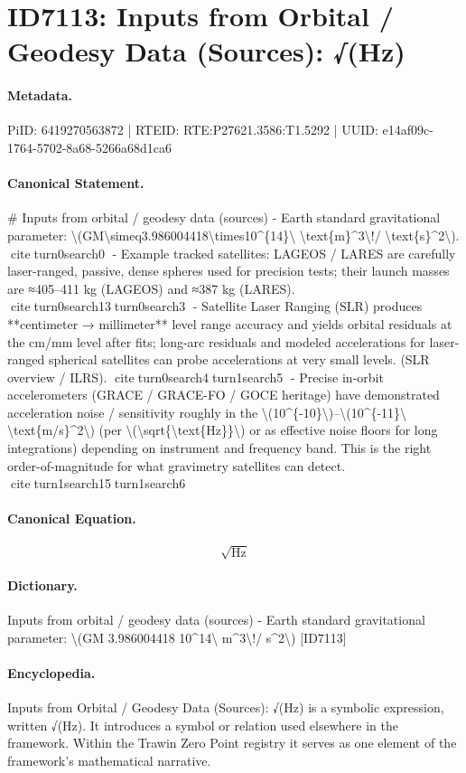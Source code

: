 \section*{ID7113: Inputs from Orbital / Geodesy Data (Sources): √(Hz)}
\paragraph{Metadata.}
PiID: 6419270563872 | RTEID: RTE:P27621.3586:T1.5292 | UUID: e14af09c-1764-5702-8a68-5266a68d1ca6

\paragraph{Canonical Statement.}
\# Inputs from orbital / geodesy data (sources) - Earth standard gravitational parameter: \textbackslash{}(GM\textbackslash{}simeq3.986004418\textbackslash{}times10\textasciicircum{}\{14\}\textbackslash{} \textbackslash{}text\{m\}\textasciicircum{}3\textbackslash{}!/ \textbackslash{}text\{s\}\textasciicircum{}2\textbackslash{}). citeturn0search0 - Example tracked satellites: LAGEOS / LARES are carefully laser-ranged, passive, dense spheres used for precision tests; their launch masses are ≈405–411 kg (LAGEOS) and ≈387 kg (LARES). citeturn0search13turn0search3 - Satellite Laser Ranging (SLR) produces **centimeter → millimeter** level range accuracy and yields orbital residuals at the cm/mm level after fits; long-arc residuals and modeled accelerations for laser-ranged spherical satellites can probe accelerations at very small levels. (SLR overview / ILRS). citeturn0search4turn1search5 - Precise in-orbit accelerometers (GRACE / GRACE-FO / GOCE heritage) have demonstrated acceleration noise / sensitivity roughly in the \textbackslash{}(10\textasciicircum{}\{-10\}\textbackslash{})–\textbackslash{}(10\textasciicircum{}\{-11\}\textbackslash{} \textbackslash{}text\{m/s\}\textasciicircum{}2\textbackslash{}) (per \textbackslash{}(\textbackslash{}sqrt\{\textbackslash{}text\{Hz\}\}\textbackslash{}) or as effective noise floors for long integrations) depending on instrument and frequency band. This is the right order-of-magnitude for what gravimetry satellites can detect. citeturn1search15turn1search6

\paragraph{Canonical Equation.}
\[
\sqrt{\text{Hz}}
\]

\paragraph{Dictionary.}
Inputs from orbital / geodesy data (sources) - Earth standard gravitational parameter: \textbackslash{}(GM 3.986004418 10\textasciicircum{}14\textbackslash{} m\textasciicircum{}3\textbackslash{}!/ s\textasciicircum{}2\textbackslash{}) [ID7113]

\paragraph{Encyclopedia.}
Inputs from Orbital / Geodesy Data (Sources): √(Hz) is a symbolic expression, written √(Hz). It introduces a symbol or relation used elsewhere in the framework. Within the Trawin Zero Point registry it serves as one element of the framework's mathematical narrative.
